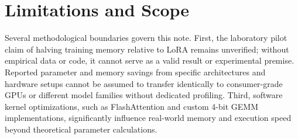 \documentclass[11pt,a4paper]{article}
\begin{document}
\section{Limitations and Scope}

Several methodological boundaries govern this note. First, the laboratory pilot claim of halving training memory relative to LoRA remains unverified; without empirical data or code, it cannot serve as a valid result or experimental premise. Reported parameter and memory savings from specific architectures and hardware setups cannot be assumed to transfer identically to consumer-grade GPUs or different model families without dedicated profiling. Third, software kernel optimizations, such as FlashAttention and custom 4-bit GEMM implementations, significantly influence real-world memory and execution speed beyond theoretical parameter calculations.



\end{document}
